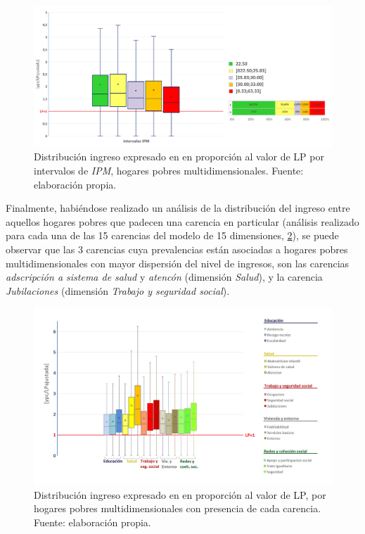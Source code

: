 \documentclass[12pt,letterpaper,spanish]{article}
\begin{document}
\begin{figure}[!]
    \centering
    \includegraphics[width=\textwidth]{Max/box_deciles2.png}
    \caption{Distribución ingreso expresado en en proporción al valor de LP por intervalos de \textit{IPM}, hogares pobres multidimensionales. Fuente: elaboración propia.}
    \label{box_deciles}
\end{figure}



Finalmente, habiéndose realizado un análisis de la distribución del ingreso entre aquellos hogares pobres que padecen una carencia en particular (análisis realizado para cada una de las 15 carencias del modelo de 15 dimensiones, \ref{box_carencias}), se puede observar que las 3 carencias cuya prevalencias están asociadas a hogares pobres multidimensionales con mayor dispersión del nivel de ingresos, son las carencias \textit{adscripción a sistema de salud} y \textit{atencón} (dimensión \textit{Salud}), y la carencia \textit{Jubilaciones} (dimensión \textit{Trabajo y seguridad social}).



\begin{figure}[!]
    \centering
    \includegraphics[width=\textwidth]{Max/box_carencias.png}
    \caption{Distribución ingreso expresado en en proporción al valor de LP, por hogares pobres multidimensionales con presencia de cada carencia. Fuente: elaboración propia.}
    \label{box_carencias}
\end{figure}
\end{document}
